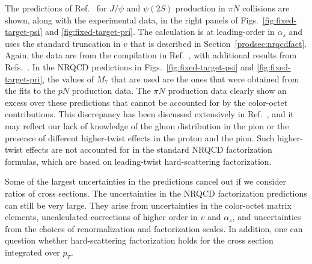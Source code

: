 The predictions of Ref.~\cite{Beneke:1996tk} for $J/\psi$ and
$\psi(2S)$ production in $\pi N$ collisions are shown, along with the
experimental data, in the right panels of 
Figs.~\ref{fig:fixed-target-psi} and \ref{fig:fixed-target-pri}. 
The calculation is at leading-order in $\alpha_s$ and uses the
standard truncation in $v$ that is described in
Section~\ref{prodsec:nrqcdfact}. Again, the data are from the compilation
in Ref.~\cite{Schuler:1994hy}, with additional results from
Refs.~\cite{Tzamarias:1990ij,Schub:1995pu,Alexopoulos:1995dt}. In the
NRQCD predictions in Figs.~\ref{fig:fixed-target-psi} and
\ref{fig:fixed-target-pri}, the values of $M_7$ that are used are the
ones that were obtained from the fits to the $pN$ production data. The
$\pi N$ production data clearly show an excess over these predictions
that cannot be accounted for by the color-octet contributions. This
discrepancy has been discussed extensively in
Ref.~\cite{Schuler:1994hy}, and it may reflect our lack of knowledge
of the gluon distribution in the pion or the presence of different
higher-twist effects in the proton and the pion. Such higher-twist
effects are not accounted for in the standard NRQCD factorization
formulas, which are based on leading-twist hard-scattering
factorization.

Some of the largest uncertainties in the predictions cancel out
if we consider ratios of cross sections.  
The uncertainties in the NRQCD factorization predictions 
can still be very large. They arise
from uncertainties in the color-octet matrix elements, uncalculated
corrections of higher order in $v$ and $\alpha_s$, and uncertainties
from the choices of renormalization and factorization scales. In
addition, one can question whether hard-scattering factorization holds
for the cross section integrated over $p_T$.

